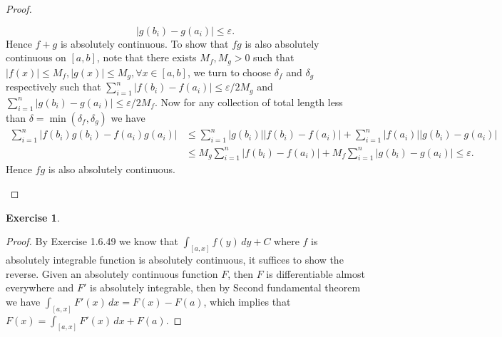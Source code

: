 \documentclass[a4paper]{article}
\newtheorem{ex}{Exercise}[subsection]
\begin{document}
\begin{proof}
\begin{enumerate}[label = (\roman*)]
$$    |g(b_i) - g(a_i)| \leq \varepsilon.
    $$Hence $f + g$ is absolutely continuous. To show that $fg$ is also absolutely continuous on $[a, b]$, note that
    there exists $M_f, M_g > 0$ such that $|f(x)|\leq M_f, |g(x)| \leq M_g, \forall x \in [a, b]$, we turn to choose
    $\delta_f$ and $\delta_g$ respectively such that $\sum_{i = 1}^n |f(b_i) - f(a_i)| \leq \varepsilon/2M_g$
    and $\sum_{i = 1}^n |g(b_i) - g(a_i)| \leq \varepsilon/2M_f$. Now for any collection of total length less than 
    $\delta = \min(\delta_f, \delta_g)$ we have \begin{align*}
    \sum_{i = 1}^n |f(b_i)g(b_i) - f(a_i)g(a_i)| &\leq \sum_{i = 1}^n |g(b_i)||f(b_i) - f(a_i)| + \sum_{i = 1}^n
    |f(a_i)||g(b_i) - g(a_i)|\\
    &\leq M_g\sum_{i = 1}^n |f(b_i) - f(a_i)| + M_f\sum_{i = 1}^n |g(b_i) - g(a_i)| \leq \varepsilon.
    \end{align*}
    Hence $fg$ is also absolutely continuous.
\end{enumerate}
\end{proof}

\begin{ex}\end{ex}\begin{proof}
By Exercise 1.6.49 we know that $\int_{[a, x]}f(y)\,dy + C$ where $f$ is absolutely integrable function is absolutely
continuous, it suffices to show the reverse. Given an absolutely continuous function $F$, then $F$ is differentiable
almost everywhere and $F'$ is absolutely integrable, then by Second fundamental theorem we have $\int_{[a, x]}F'(x)\,dx = F(x) - F(a)$,
which implies that $F(x) = \int_{[a,x]}F'(x)\,dx + F(a)$.
\end{proof}
\end{document}
